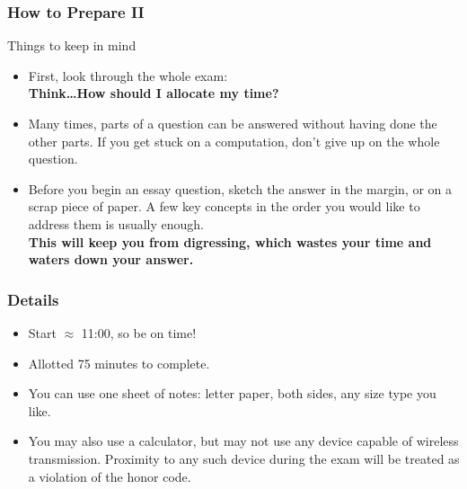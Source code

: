 \documentclass[9pt]{beamer}
\begin{document}

\begin{frame}[t]
\frametitle{How to Prepare II}
Things to keep in mind
\medskip
\begin{itemize}
\item First, look through the whole exam: \\
\medskip
\textbf{Think\ldots How should I allocate my time?}
\medskip
\item Many times, parts of a question can be answered without having done
the other parts. If you get stuck on a computation, don't give up on the whole
question.
\medskip
\item Before you begin an essay question, sketch the answer in the margin, or on a scrap
piece of paper. A few key concepts in the order you would like to address them is usually
enough.\\
\medskip
 \textbf{This will keep you from digressing, which wastes your time and waters down
your answer.}\\
\end{itemize}
\bigskip
\end{frame}


\begin{frame}[t]
\frametitle{Details}
\bigskip
\begin{itemize}
\item Start $\approx$ 11:00, so be on time!
\bigskip
\item Allotted 75 minutes to complete.
\bigskip
\item You can use one sheet of notes: letter paper, both sides, any size type you like.
\bigskip
\item You may also use a calculator, but may not use any device capable of wireless transmission. Proximity to any such device during the exam will be treated as a violation of the honor
code.
\bigskip
\end{itemize}
\bigskip
\end{frame}
\end{document}
